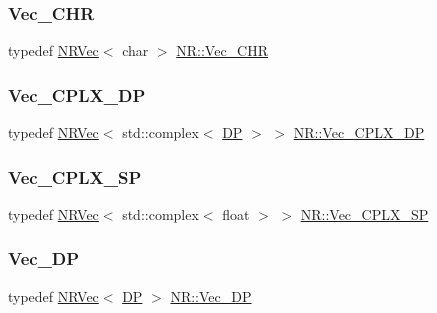 \subsubsection{\texorpdfstring{Vec\_CHR}{Vec\_CHR}}
{\footnotesize\ttfamily typedef \mbox{\hyperlink{classNR_1_1NRVec}{N\+R\+Vec}}$<$ char $>$ \mbox{\hyperlink{namespaceNR_a8bdd7b71b3ea3283f23eed0cfabaf38c}{N\+R\+::\+Vec\+\_\+\+C\+HR}}}

\mbox{\label{namespaceNR_a536dbe7aa725634b172a6c366a0a3e4f}} 
\subsubsection{\texorpdfstring{Vec\_CPLX\_DP}{Vec\_CPLX\_DP}}
{\footnotesize\ttfamily typedef \mbox{\hyperlink{classNR_1_1NRVec}{N\+R\+Vec}}$<$ std\+::complex$<$ \mbox{\hyperlink{namespaceNR_af6ff762dd605ff477b8e52387253a02a}{DP}} $>$ $>$ \mbox{\hyperlink{namespaceNR_a536dbe7aa725634b172a6c366a0a3e4f}{N\+R\+::\+Vec\+\_\+\+C\+P\+L\+X\+\_\+\+DP}}}

\mbox{\label{namespaceNR_a3bb807d9aeb8d5c1d651fbc7ceb3a45b}} 
\subsubsection{\texorpdfstring{Vec\_CPLX\_SP}{Vec\_CPLX\_SP}}
{\footnotesize\ttfamily typedef \mbox{\hyperlink{classNR_1_1NRVec}{N\+R\+Vec}}$<$ std\+::complex$<$ float $>$ $>$ \mbox{\hyperlink{namespaceNR_a3bb807d9aeb8d5c1d651fbc7ceb3a45b}{N\+R\+::\+Vec\+\_\+\+C\+P\+L\+X\+\_\+\+SP}}}

\mbox{\label{namespaceNR_a115a3196718c98e8e2562d80b06c23c5}} 
\subsubsection{\texorpdfstring{Vec\_DP}{Vec\_DP}}
{\footnotesize\ttfamily typedef \mbox{\hyperlink{classNR_1_1NRVec}{N\+R\+Vec}}$<$ \mbox{\hyperlink{namespaceNR_af6ff762dd605ff477b8e52387253a02a}{DP}} $>$ \mbox{\hyperlink{namespaceNR_a115a3196718c98e8e2562d80b06c23c5}{N\+R\+::\+Vec\+\_\+\+DP}}}

\mbox{\label{namespaceNR_ace6a74f7f9700e1416d49842d8ac29ea}} 
